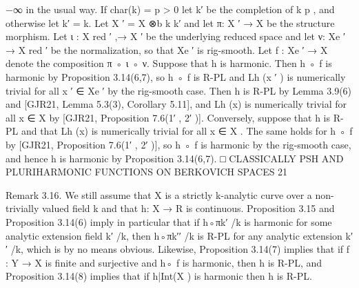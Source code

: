 \documentclass[
  10pt,
]{article}
\newenvironment{Shaded}{}{}
\newcommand{\NormalTok}[1]{#1}
\begin{document}
\begin{Shaded}
\begin{Highlighting}[]
\NormalTok{                                                                         −∞}
\NormalTok{in the usual way. If char(k) = p \textgreater{} 0 let k′ be the completion of k p , and otherwise let}
\NormalTok{k′ = k. Let X ′ = X ⊗b k k′ and let π: X ′ → X be the structure morphism. Let ι : X red}
\NormalTok{                                                                                      ′}
\NormalTok{                                                                                        ,→ X ′}
\NormalTok{be the underlying reduced space and let ν: Xe ′ → X red  ′}
\NormalTok{                                                            be the normalization, so that Xe ′ is}
\NormalTok{rig{-}smooth. Let f : Xe ′ → X denote the composition π ◦ ι ◦ ν.}
\NormalTok{   Suppose that h is harmonic. Then h ◦ f is harmonic by Proposition 3.14(6,7), so h ◦ f}
\NormalTok{is R{-}PL and Lh (x ′ ) is numerically trivial for all x ′ ∈ Xe ′ by the rig{-}smooth case. Then}
\NormalTok{h is R{-}PL by Lemma 3.9(6) and [GJR21, Lemma 5.3(3), Corollary 5.11], and Lh (x) is}
\NormalTok{numerically trivial for all x ∈ X by [GJR21, Proposition 7.6(1′ , 2′ )]. Conversely, suppose}
\NormalTok{that h is R{-}PL and that Lh (x) is numerically trivial for all x ∈ X . The same holds for}
\NormalTok{h ◦ f by [GJR21, Proposition 7.6(1′ , 2′ )], so h ◦ f is harmonic by the rig{-}smooth case, and}
\NormalTok{hence h is harmonic by Proposition 3.14(6,7).                                                  □}
\NormalTok{             CLASSICALLY PSH AND PLURIHARMONIC FUNCTIONS ON BERKOVICH SPACES               21}

\NormalTok{Remark 3.16. We still assume that X is a strictly k{-}analytic curve over a non{-}trivially}
\NormalTok{valued field k and that h: X → R is continuous. Proposition 3.15 and Proposition 3.14(6)}
\NormalTok{imply in particular that if h◦πk′ /k is harmonic for some analytic extension field k′ /k, then}
\NormalTok{h◦πk′′ /k is R{-}PL for any analytic extension k′′ /k, which is by no means obvious. Likewise,}
\NormalTok{Proposition 3.14(7) implies that if f : Y → X is finite and surjective and h◦ f is harmonic,}
\NormalTok{then h is R{-}PL, and Proposition 3.14(8) implies that if h|Int(X ) is harmonic then h is R{-}PL.}


\end{Highlighting}
\end{Shaded}
\end{document}
